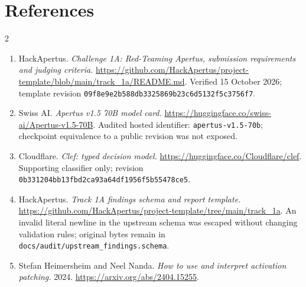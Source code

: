 \documentclass[10pt,a4paper]{article}
\newcommand{\pathtext}[1]{\nolinkurl{#1}}
\begin{document}
\section*{References}
\begin{multicols}{2}
\fontsize{8.5}{9.5}\selectfont\raggedright
\begin{enumerate}[leftmargin=18pt,itemsep=3pt]
\item HackApertus. \emph{Challenge 1A: Red-Teaming Apertus, submission requirements and judging criteria.} \url{https://github.com/HackApertus/project-template/blob/main/track_1a/README.md}. Verified 15 October 2026; template revision \pathtext{09f8e9e2b588db3325869b23c6d5132f5c3756f7}.
\item Swiss AI. \emph{Apertus v1.5 70B model card.} \url{https://huggingface.co/swiss-ai/Apertus-v1.5-70B}. Audited hosted identifier: \pathtext{apertus-v1.5-70b}; checkpoint equivalence to a public revision was not exposed.
\item Cloudflare. \emph{Clef: typed decision model.} \url{https://huggingface.co/Cloudflare/clef}. Supporting classifier only; revision \pathtext{0b331204bb13fbd2ca93a64df1956f5b55478ce5}.
\item HackApertus. \emph{Track 1A findings schema and report template.} \url{https://github.com/HackApertus/project-template/tree/main/track_1a}. An invalid literal newline in the upstream schema was escaped without changing validation rules; original bytes remain in \pathtext{docs/audit/upstream_findings.schema}.
\item Stefan Heimersheim and Neel Nanda. \emph{How to use and interpret activation patching.} 2024. \url{https://arxiv.org/abs/2404.15255}.
\end{enumerate}
\end{multicols}
\end{document}

